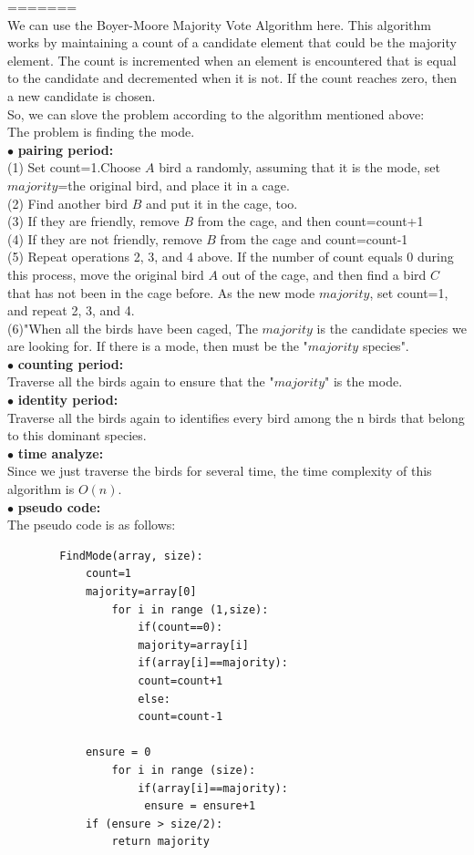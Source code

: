 \documentclass[12pt,a4paper]{article}
\newcommand{\question}[1]{\bigskip\noindent{\textbf{Q{#1} solution}}}
\begin{document}
=======
\question{15.A}
\\We can use the Boyer-Moore Majority Vote Algorithm here. This algorithm works by maintaining a count of a candidate element that could be the majority element.
The count is incremented when an element is encountered that is equal to the candidate and decremented when it is not. If the count reaches zero, then a new candidate is chosen.
\\So, we can slove the problem according to the algorithm mentioned above:
\\The problem is finding the mode.
\\$\bullet$ \textbf{pairing period:}
\\(1) Set count=1.Choose $A$ bird a randomly, assuming that it is the mode, set $majority$=the original bird, and place it in a cage.
\\(2) Find another bird $B$ and put it in the cage, too.
\\(3) If they are friendly, remove $B$ from the cage, and then count=count+1
\\(4) If they are not friendly, remove $B$ from the cage and count=count-1
\\(5) Repeat operations 2, 3, and 4 above. If the number of count equals 0 during this process, move the original bird $A$ out of the cage, and then find a bird $C$ that has not been in the cage before. As the new mode $majority$, set count=1, and repeat 2, 3, and 4.
\\(6)"When all the birds have been caged, The $majority$ is the candidate species we are looking for. If there is a mode, then must be the "$majority$ species".
\\$\bullet$ \textbf{counting period:}
\\Traverse all the birds again to ensure that the "$majority$" is the mode.
\\$\bullet$ \textbf{identity period:}
\\Traverse all the birds again to  identifies every bird among the n birds that belong to this dominant species.
\\$\bullet$ \textbf{time analyze:}
\\ Since we just traverse the birds for several time, the time complexity of this algorithm is $O(n)$.
\\$\bullet$ \textbf{pseudo code:}
\\The pseudo code is as follows:
	\begin{lstlisting}
		FindMode(array, size):
	  		count=1
       	 	majority=array[0]
        		for i in range (1,size):
		            if(count==0): 
					majority=array[i]
		            if(array[i]==majority): 
					count=count+1
		            else: 
					count=count-1
			
			ensure = 0
        		for i in range (size):
		            if(array[i]==majority):
					 ensure = ensure+1
	  		if (ensure > size/2):
				return majority
	\end{lstlisting}
\end{document}
